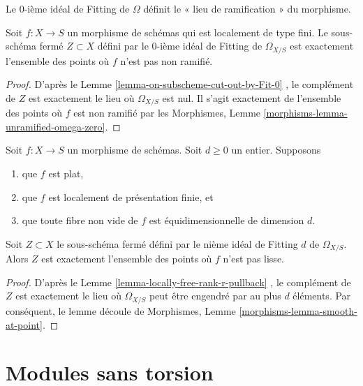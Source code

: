 \noindent
Le  $0$-ième idéal de Fitting de  $\Omega$  définit le « lieu de
ramification » du morphisme.

\begin{lemma}
\label{lemma-zero-fitting-ideal-omega-unramified}
Soit  $f : X \to S$  un morphisme de schémas qui est localement de type fini. Le
sous-schéma fermé  $Z \subset X$  défini par le  $0$-ième idéal de Fitting de
 $\Omega_{X/S}$  est exactement l'ensemble des points où  $f$  n'est pas non
ramifié.
\end{lemma}

\begin{proof}
D'après le Lemme  \ref{lemma-on-subscheme-cut-out-by-Fit-0} , le complément de  $Z$  est exactement le
lieu où  $\Omega_{X/S}$  est nul. Il s'agit exactement de l'ensemble des points où
 $f$  est non ramifié par les Morphismes, Lemme  \ref{morphisms-lemma-unramified-omega-zero}.
\end{proof}

\begin{lemma}
\label{lemma-d-fitting-ideal-omega-smooth}
Soit  $f : X \to S$  un morphisme de schémas. Soit  $d \geq 0$  un entier. Supposons
\begin{enumerate}
\item que $f$  est plat,
\item que $f$  est localement de présentation finie, et
\item que toute fibre non vide de  $f$  est équidimensionnelle de dimension
 $d$.
\end{enumerate}
Soit  $Z \subset X$  le sous-schéma fermé défini par le nième idéal de Fitting
 $d$ de  $\Omega_{X/S}$. Alors  $Z$  est exactement l'ensemble des
points où  $f$  n'est pas lisse.
\end{lemma}

\begin{proof}
D'après le Lemme  \ref{lemma-locally-free-rank-r-pullback} , le complément de  $Z$  est exactement le
lieu où  $\Omega_{X/S}$  peut être engendré par au plus  $d$  éléments. Par
conséquent, le lemme découle de Morphismes, Lemme  \ref{morphisms-lemma-smooth-at-point}.
\end{proof}







\section{Modules sans torsion}
\label{section-torsion-free}

